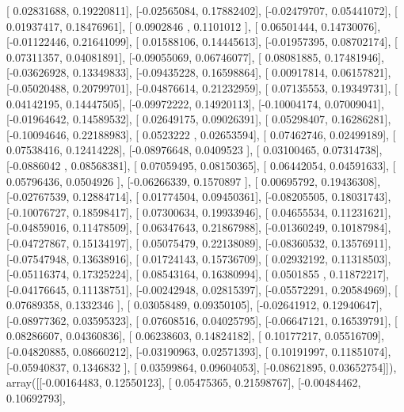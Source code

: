 \documentclass{article}
\begin{document}
       [ 0.02831688,  0.19220811],
       [-0.02565084,  0.17882402],
       [-0.02479707,  0.05441072],
       [ 0.01937417,  0.18476961],
       [ 0.0902846 ,  0.1101012 ],
       [ 0.06501444,  0.14730076],
       [-0.01122446,  0.21641099],
       [ 0.01588106,  0.14445613],
       [-0.01957395,  0.08702174],
       [ 0.07311357,  0.04081891],
       [-0.09055069,  0.06746077],
       [ 0.08081885,  0.17481946],
       [-0.03626928,  0.13349833],
       [-0.09435228,  0.16598864],
       [ 0.00917814,  0.06157821],
       [-0.05020488,  0.20799701],
       [-0.04876614,  0.21232959],
       [ 0.07135553,  0.19349731],
       [ 0.04142195,  0.14447505],
       [-0.09972222,  0.14920113],
       [-0.10004174,  0.07009041],
       [-0.01964642,  0.14589532],
       [ 0.02649175,  0.09026391],
       [ 0.05298407,  0.16286281],
       [-0.10094646,  0.22188983],
       [ 0.0523222 ,  0.02653594],
       [ 0.07462746,  0.02499189],
       [ 0.07538416,  0.12414228],
       [-0.08976648,  0.0409523 ],
       [ 0.03100465,  0.07314738],
       [-0.0886042 ,  0.08568381],
       [ 0.07059495,  0.08150365],
       [ 0.06442054,  0.04591633],
       [ 0.05796436,  0.0504926 ],
       [-0.06266339,  0.1570897 ],
       [ 0.00695792,  0.19436308],
       [-0.02767539,  0.12884714],
       [ 0.01774504,  0.09450361],
       [-0.08205505,  0.18031743],
       [-0.10076727,  0.18598417],
       [ 0.07300634,  0.19933946],
       [ 0.04655534,  0.11231621],
       [-0.04859016,  0.11478509],
       [ 0.06347643,  0.21867988],
       [-0.01360249,  0.10187984],
       [-0.04727867,  0.15134197],
       [ 0.05075479,  0.22138089],
       [-0.08360532,  0.13576911],
       [-0.07547948,  0.13638916],
       [ 0.01724143,  0.15736709],
       [ 0.02932192,  0.11318503],
       [-0.05116374,  0.17325224],
       [ 0.08543164,  0.16380994],
       [ 0.0501855 ,  0.11872217],
       [-0.04176645,  0.11138751],
       [-0.00242948,  0.02815397],
       [-0.05572291,  0.20584969],
       [ 0.07689358,  0.1332346 ],
       [ 0.03058489,  0.09350105],
       [-0.02641912,  0.12940647],
       [-0.08977362,  0.03595323],
       [ 0.07608516,  0.04025795],
       [-0.06647121,  0.16539791],
       [ 0.08286607,  0.04360836],
       [ 0.06238603,  0.14824182],
       [ 0.10177217,  0.05516709],
       [-0.04820885,  0.08660212],
       [-0.03190963,  0.02571393],
       [ 0.10191997,  0.11851074],
       [-0.05940837,  0.1346832 ],
       [ 0.03599864,  0.09604053],
       [-0.08621895,  0.03652754]]), array([[-0.00164483,  0.12550123],
       [ 0.05475365,  0.21598767],
       [-0.00484462,  0.10692793],
\end{document}

